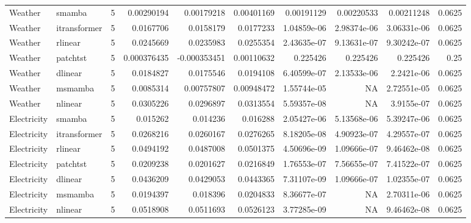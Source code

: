 \begin{longtable}{llrrrrrrrr}
Weather & smamba & 5 & 0.00290194 & 0.00179218 & 0.00401169 & 0.00191129 & 0.00220533 & 0.00211248 & 0.0625 \\
Weather & itransformer & 5 & 0.0167706 & 0.0158179 & 0.0177233 & 1.04859e-06 & 2.98374e-06 & 3.06331e-06 & 0.0625 \\
Weather & rlinear & 5 & 0.0245669 & 0.0235983 & 0.0255354 & 2.43635e-07 & 9.13631e-07 & 9.30242e-07 & 0.0625 \\
Weather & patchtst & 5 & 0.000376435 & -0.000353451 & 0.00110632 & 0.225426 & 0.225426 & 0.225426 & 0.25 \\
Weather & dlinear & 5 & 0.0184827 & 0.0175546 & 0.0194108 & 6.40599e-07 & 2.13533e-06 & 2.2421e-06 & 0.0625 \\
Weather & msmamba & 5 & 0.0085314 & 0.00757807 & 0.00948472 & 1.55744e-05 & NA & 2.72551e-05 & 0.0625 \\
Weather & nlinear & 5 & 0.0305226 & 0.0296897 & 0.0313554 & 5.59357e-08 & NA & 3.9155e-07 & 0.0625 \\
Electricity & smamba & 5 & 0.015262 & 0.014236 & 0.016288 & 2.05427e-06 & 5.13568e-06 & 5.39247e-06 & 0.0625 \\
Electricity & itransformer & 5 & 0.0268216 & 0.0260167 & 0.0276265 & 8.18205e-08 & 4.90923e-07 & 4.29557e-07 & 0.0625 \\
Electricity & rlinear & 5 & 0.0494192 & 0.0487008 & 0.0501375 & 4.50696e-09 & 1.09666e-07 & 9.46462e-08 & 0.0625 \\
Electricity & patchtst & 5 & 0.0209238 & 0.0201627 & 0.0216849 & 1.76553e-07 & 7.56655e-07 & 7.41522e-07 & 0.0625 \\
Electricity & dlinear & 5 & 0.0436209 & 0.0429053 & 0.0443365 & 7.31107e-09 & 1.09666e-07 & 1.02355e-07 & 0.0625 \\
Electricity & msmamba & 5 & 0.0194397 & 0.018396 & 0.0204833 & 8.36677e-07 & NA & 2.70311e-06 & 0.0625 \\
Electricity & nlinear & 5 & 0.0518908 & 0.0511693 & 0.0526123 & 3.77285e-09 & NA & 9.46462e-08 & 0.0625 \\
\bottomrule
\end{longtable}

